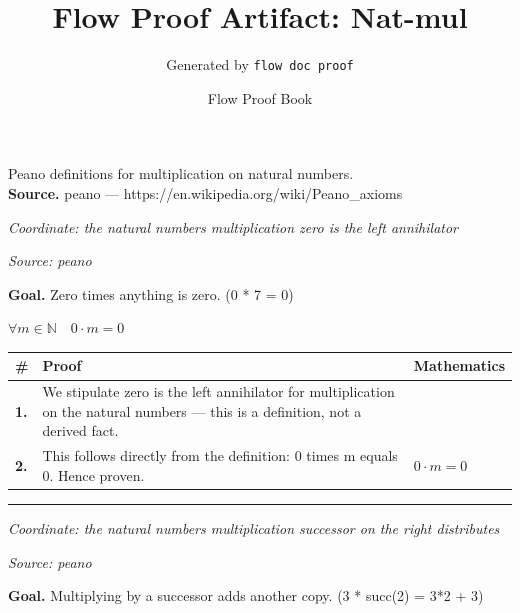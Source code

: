 \documentclass[11pt]{article}
\title{Flow Proof Artifact: Nat-mul}
\author{Generated by \texttt{flow doc proof}}
\date{Flow Proof Book}
\theoremstyle{definition}
\begin{document}
\maketitle
Peano definitions for multiplication on natural numbers.\\[0.5em]
\textbf{Source.} peano — https://en.wikipedia.org/wiki/Peano\_axioms\\[0.5em]
\bigskip
{}\par
\smallskip\noindent\textit{Coordinate: the natural numbers \cdot multiplication \cdot zero is the left annihilator}\par
\smallskip\noindent\textit{Source: peano}\par
\medskip
\noindent\textbf{Goal.} Zero times anything is zero.  (0 * 7 = 0)\par
\noindent$\displaystyle \forall m \in \mathbb{N}\quad 0 \cdot m = 0$\par
\medskip
\noindent
\begin{tabular}{@{} >{\raggedright\arraybackslash}p{} >{\raggedright\arraybackslash}p{} >{\raggedleft\arraybackslash}p{} @{}}
\textbf{\#} & \textbf{Proof} & \textbf{Mathematics} \\
\midrule
\textbf{1.} & We stipulate zero is the left annihilator for multiplication on the natural numbers — this is a definition, not a derived fact. & \\[0.45em]
\textbf{2.} & This follows directly from the definition: 0 times m equals 0. Hence proven. & $\displaystyle 0 \cdot m = 0$ \\[0.45em]
\bottomrule
\end{tabular}
\label{thm:Nat-multiplication-zero_is_the_left_annihilator}
\par\medskip\hrule
\bigskip
{}\par
\smallskip\noindent\textit{Coordinate: the natural numbers \cdot multiplication \cdot successor on the right distributes}\par
\smallskip\noindent\textit{Source: peano}\par
\medskip
\noindent\textbf{Goal.} Multiplying by a successor adds another copy.  (3 * succ(2) = 3*2 + 3)\par
\end{document}

